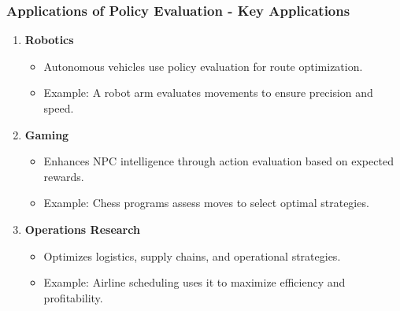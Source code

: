 \documentclass[aspectratio=169]{beamer}
\begin{document}
\begin{frame}[fragile]
    \frametitle{Applications of Policy Evaluation - Key Applications}
    \begin{enumerate}
        \item \textbf{Robotics}
            \begin{itemize}
                \item Autonomous vehicles use policy evaluation for route optimization.
                \item Example: A robot arm evaluates movements to ensure precision and speed.
            \end{itemize}
        \item \textbf{Gaming}
            \begin{itemize}
                \item Enhances NPC intelligence through action evaluation based on expected rewards.
                \item Example: Chess programs assess moves to select optimal strategies.
            \end{itemize}
        \item \textbf{Operations Research}
            \begin{itemize}
                \item Optimizes logistics, supply chains, and operational strategies.
                \item Example: Airline scheduling uses it to maximize efficiency and profitability.
            \end{itemize}
    \end{enumerate}
\end{frame}
\end{document}
